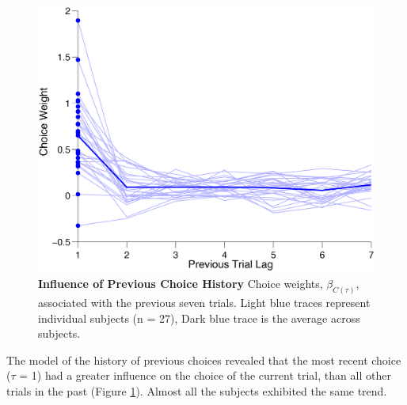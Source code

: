 \begin{figure}
  \centering
  	\includegraphics[width=\textwidth]{Figures/chapter2/history_past_choices_model.png}
  \caption[Influence of Previous Choice History]{\textbf{Influence of Previous Choice History} Choice weights, $\beta_{C(\tau)}$, associated with the previous seven trials. Light blue traces represent individual subjects (n = 27), Dark blue trace is the average across subjects.}
   \label{fig:prevchoiceshist}
\end{figure}
The model of the history of previous choices revealed that the most recent choice ($\tau$ = 1) had a greater influence on the choice of the current trial, than all other trials in the past (Figure \ref{fig:prevchoiceshist}). Almost all the subjects exhibited the same trend. 
